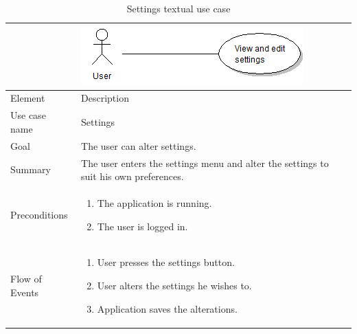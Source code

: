 \begin{table}
\begin{tabular}{p{3cm}p{12cm}}
& \includegraphics{settings}\\ \hline
Element & Description \\ \hline
Use case name & Settings \\
Goal & The user can alter settings. \\
Summary & The user enters the settings menu and alter the settings to suit his own preferences. \\
Preconditions &
\begin{enumerate}
\item{}The application is running.
\item{}The user is logged in.
\end{enumerate} \\ \hline
Flow of Events &
\begin{enumerate}
\item{}User presses the settings button.
\item{}User alters the settings he wishes to.
\item{}Application saves the alterations.
\end{enumerate}
\end{tabular}
\caption{Settings textual use case} \label{tab:settings}
\end{table}

